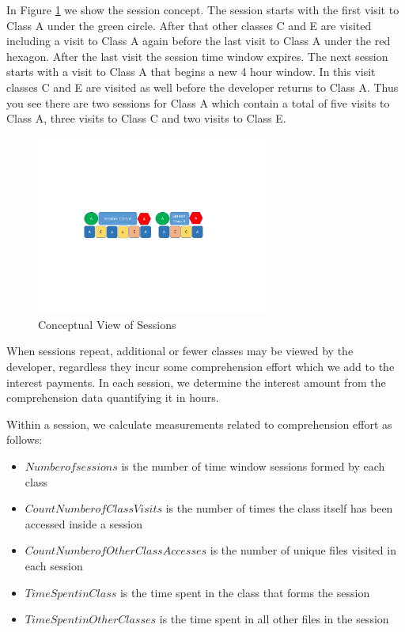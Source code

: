 In Figure \ref{fig:SessionDataConcept} we show the session concept.  The session starts with the first visit to Class A under the green circle.  After that other classes C and E are visited including a visit to Class A again before the last visit to Class A under the red hexagon.  After the last visit the session time window expires.  The next session starts with a visit to Class A that begins a new 4 hour window.  In this visit classes C and E are visited as well before the developer returns to Class A.  Thus you see there are two sessions for Class A which contain a total of five visits to Class A, three visits to Class C and two visits to Class E.
\begin{figure}
	\centering
	\includegraphics[width=3in]{SessionDataConcept.pdf}
	\caption{Conceptual View of Sessions}
	\label{fig:SessionDataConcept}
\end{figure}

When sessions repeat, additional or fewer classes may be viewed by the developer, regardless they incur some comprehension effort which we add to the interest payments.  In each session, we determine the interest amount from the comprehension data quantifying it in hours. 


Within a session, we calculate measurements related to comprehension effort as follows:
\begin{itemize}
	\item[] $Number of sessions$ is the number of time window sessions formed by each class 
	\item[] $Count Number of Class Visits$ is the number of times the class itself has been accessed inside a session 
	\item[] $Count Number of Other Class Accesses$ is the number of unique files visited in each session
	\item[] $Time Spent in Class$ is the time spent in the class that forms the session
	\item[] $Time Spent in Other Classes$ is the time spent in all other files in the session
\end{itemize}

